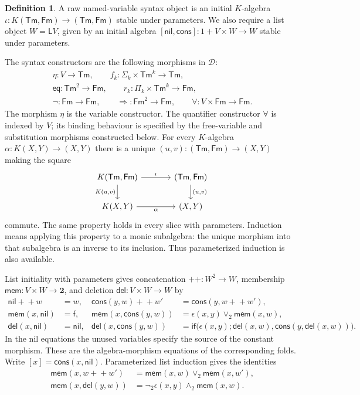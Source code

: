 \documentclass[11pt]{article}
\theoremstyle{definition}\newtheorem{definition}[theorem]{Definition}
\newcommand{\Tm}{\mathsf{Tm}}
\newcommand{\Fm}{\mathsf{Fm}}
\newcommand{\Two}{\mathbf 2}
\newcommand{\List}{\mathsf L}
\newcommand{\nil}{\mathsf{nil}}
\newcommand{\cons}{\mathsf{cons}}
\newcommand{\mem}{\mathsf{mem}}
\newcommand{\del}{\mathsf{del}}
\begin{document}
\begin{definition}\label{def:categorical-syntax}
A raw named-variable syntax object is an initial $K$-algebra
$\iota:K(\Tm,\Fm)\to(\Tm,\Fm)$ stable under parameters.
We also require a list object $W=\List V$, given by an initial
algebra $[\nil,\cons]:1+V\times W\to W$ stable under parameters.
\end{definition}

The syntax constructors are the following morphisms in $\mathcal D$:
\begin{gather*}
 \eta:V\to\Tm,\qquad f_k:\Sigma_k\times\Tm^k\to\Tm,\\
 {\mathsf{eq}}:\Tm^2\to\Fm,\qquad
 r_k:\Pi_k\times\Tm^k\to\Fm,\\
 \neg:\Fm\to\Fm,\qquad
 {\Rightarrow}:\Fm^2\to\Fm,\qquad
 {\forall}:V\times\Fm\to\Fm.
\end{gather*}
The morphism $\eta$ is the variable constructor.
The quantifier constructor $\forall$ is indexed
by $V$; its binding behaviour is specified by the free-variable and
substitution morphisms constructed below.
For every $K$-algebra $\alpha:K(X,Y)\to(X,Y)$ there is a unique
$(u,v):(\Tm,\Fm)\to(X,Y)$ making the square
\[
\begin{tikzcd}[column sep=large]
 K(\Tm,\Fm)\arrow[r,"\iota"]\arrow[d,"{K(u,v)}"'] &
 (\Tm,\Fm)\arrow[d,"{(u,v)}"]\\
 K(X,Y)\arrow[r,"\alpha"'] & (X,Y)
\end{tikzcd}
\]
commute. The same property holds in every slice with parameters.
Induction means applying this property to a monic subalgebra:
the unique morphism into that subalgebra is an inverse to its
inclusion. Thus parameterized induction is also available.

List initiality with parameters gives concatenation
$+\!+:W^2\to W$, membership $\mem:V\times W\to\Two$, and
deletion $\del:V\times W\to W$ by
\begin{align*}
 \nil+\!+w&=w,&
 \cons(y,w)+\!+w'&=\cons(y,w+\!+w'),\\
 \mem(x,\nil)&=\mathsf f,&
 \mem(x,\cons(y,w))&=\epsilon(x,y)\vee_2\mem(x,w),\\
 \del(x,\nil)&=\nil,&
 \del(x,\cons(y,w))&=
 \mathsf{if}\bigl(\epsilon(x,y);\del(x,w),
                         \cons(y,\del(x,w))\bigr).
\end{align*}
In the nil equations the unused variables specify the source of the
constant morphism. These are the algebra-morphism equations of the
corresponding folds. Write $[x]=\cons(x,\nil)$.
Parameterized list induction gives the identities
\begin{align*}
 \mem(x,w+\!+w')&=\mem(x,w)\vee_2\mem(x,w'),\\
 \mem(x,\del(y,w))&=\neg_2\epsilon(x,y)\wedge_2\mem(x,w).
\end{align*}
\end{document}
